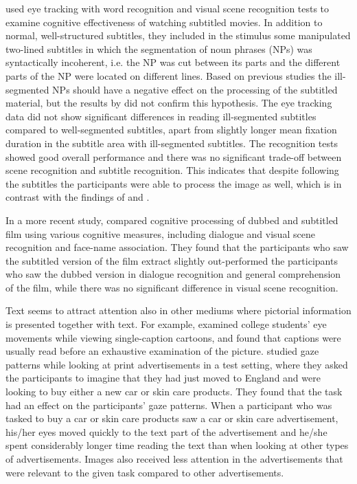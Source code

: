 \documentclass[output=paper]{langsci/langscibook}
\begin{document}
\citet{Perego2010} used eye tracking with word recognition and visual scene recognition tests to examine cognitive effectiveness of watching subtitled movies. In addition to normal, well-structured subtitles, they included in the stimulus some manipulated two-lined subtitles in which the segmentation of noun phrases (NPs) was syntactically incoherent, i.e. the NP was cut between its parts and the different parts of the NP were located on different lines. Based on previous studies \citep{Perego2008} the ill-segmented NPs should have a negative effect on the processing of the subtitled material, but the results by \citet{Perego2010} did not confirm this hypothesis. The eye tracking data did not show significant differences in reading ill-segmented subtitles compared to well-segmented subtitles, apart from slightly longer mean fixation duration in the subtitle area with ill-segmented subtitles. The recognition tests showed good overall performance and there was no significant trade-off between scene recognition and subtitle recognition. This indicates that despite following the subtitles the participants were able to process the image as well, which is in contrast with the findings of \citet{lee2013} and \citet{lavaur2011}.

In a more recent study, \citet{Perego2015} compared cognitive processing of dubbed and subtitled film using various cognitive measures, including dialogue and visual scene recognition and face-name association. They found that the participants who saw the subtitled version of the film extract slightly out-performed the participants who saw the dubbed version in dialogue recognition and general comprehension of the film, while there was no significant difference in visual scene recognition. 

Text seems to attract attention also in other mediums where pictorial information is presented together with text. For example, \citet{carroll1992} examined college students’ eye movements while viewing single-caption cartoons, and found that captions were usually read before an exhaustive examination of the picture. \citet{rayner2001} studied gaze patterns while looking at print advertisements in a test setting, where they asked the participants to imagine that they had just moved to England and were looking to buy either a new car or skin care products. They found that the task had an effect on the participants’ gaze patterns. When a participant who was tasked to buy a car or skin care products saw a car or skin care advertisement, his/her eyes moved quickly to the text part of the advertisement and he/she spent considerably longer time reading the text than when looking at other types of advertisements. Images also received less attention in the advertisements that were relevant to the given task compared to other advertisements.
\end{document}
